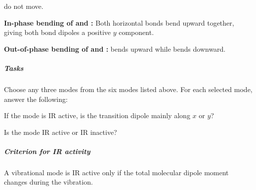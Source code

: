 \begin{problem}[note =  
  IR Activity of Vibrational Modes in a Fictitious Molecule]
\begin{enumext}
    do not move.
    \item \textbf{In-phase bending of  and :}
    Both horizontal bonds
    bend upward together, giving both bond dipoles a positive $y$ component.
    \item \textbf{Out-of-phase bending of  and :}
     bends upward while  bends downward.
  \end{enumext}
  \subparagraph{Tasks}
  Choose any three modes from the six modes listed above.
  For each selected mode, answer the following:
  \begin{enumext}[label = \arabic*.]
    \item If the mode is IR active, is the transition dipole mainly along $x$
    or $y$?
    \item Is the mode IR active or IR inactive?
  \end{enumext}
  \subparagraph{Criterion for IR activity}
  A vibrational mode is IR active only if the total molecular dipole moment
  changes during the vibration.
\end{problem}
\pagebreak
